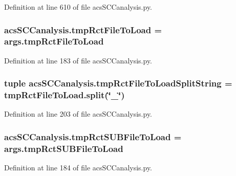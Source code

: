 Definition at line 610 of file acs\-S\-C\-Canalysis.\-py.

\hypertarget{a00128_aa2f655aa323f5eaef7509135b8af5722}{
\subsubsection[{tmp\-Rct\-File\-To\-Load}]{\setlength{\rightskip}{0pt plus 5cm}acs\-S\-C\-Canalysis.\-tmp\-Rct\-File\-To\-Load = args.\-tmp\-Rct\-File\-To\-Load}}\label{a00128_aa2f655aa323f5eaef7509135b8af5722}


Definition at line 183 of file acs\-S\-C\-Canalysis.\-py.

\hypertarget{a00128_add910e17b3f1fe61cdbaf8ce60ec0e20}{
\subsubsection[{tmp\-Rct\-File\-To\-Load\-Split\-String}]{\setlength{\rightskip}{0pt plus 5cm}tuple acs\-S\-C\-Canalysis.\-tmp\-Rct\-File\-To\-Load\-Split\-String = {\bf tmp\-Rct\-File\-To\-Load.\-split}(\char`\"{}\-\_\-\char`\"{})}}\label{a00128_add910e17b3f1fe61cdbaf8ce60ec0e20}


Definition at line 203 of file acs\-S\-C\-Canalysis.\-py.

\hypertarget{a00128_a8dd4ba8a8e597b56376879ba4cf1f41d}{
\subsubsection[{tmp\-Rct\-S\-U\-B\-File\-To\-Load}]{\setlength{\rightskip}{0pt plus 5cm}acs\-S\-C\-Canalysis.\-tmp\-Rct\-S\-U\-B\-File\-To\-Load = args.\-tmp\-Rct\-S\-U\-B\-File\-To\-Load}}\label{a00128_a8dd4ba8a8e597b56376879ba4cf1f41d}


Definition at line 184 of file acs\-S\-C\-Canalysis.\-py.

